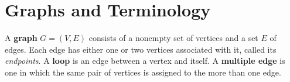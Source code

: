 \section{Graphs and Terminology}

\begin{definition}
    A \textbf{graph} $G=(V,E)$ consists of a nonempty set of vertices and a set $E$ of edges. Each edge has either one or two vertices associated with it, called its \textit{endpoints}. A \textbf{loop} is an edge between a vertex and itself. A \textbf{multiple edge} is one in which the same pair of vertices is assigned to the more than one edge.  
\end{definition}